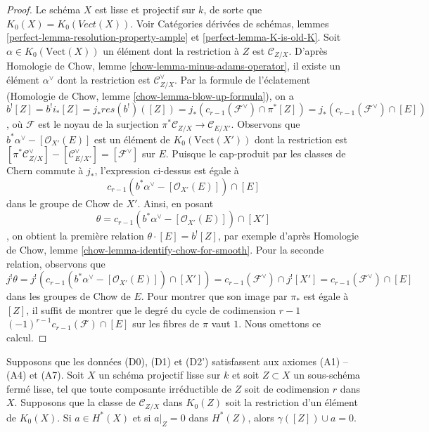\begin{proof}
Le schéma $X$ est lisse et projectif sur $k$, de sorte que
$K_0(X) = K_0(\textit{Vect}(X))$. Voir
Catégories dérivées de schémas, lemmes
\ref{perfect-lemma-resolution-property-ample} et
\ref{perfect-lemma-K-is-old-K}.
Soit $\alpha \in K_0(\text{Vect}(X))$ un élément
dont la restriction à $Z$ est $\mathcal{C}_{Z/X}$.
D'après Homologie de Chow, lemme \ref{chow-lemma-minus-adams-operator},
il existe un élément $\alpha^\vee$ dont la restriction est
$\mathcal{C}_{Z/X}^\vee$. Par la formule de l'éclatement
(Homologie de Chow, lemme \ref{chow-lemma-blow-up-formula}),
on a
$$
b^![Z] = b^!i_*[Z] = j_* res(b^!)([Z]) =
j_*(c_{r - 1}(\mathcal{F}^\vee) \cap \pi^*[Z]) =
j_*(c_{r - 1}(\mathcal{F}^\vee) \cap [E])
$$,
où $\mathcal{F}$ est le noyau de la surjection
$\pi^*\mathcal{C}_{Z/X} \to \mathcal{C}_{E/X'}$.
Observons que $b^*\alpha^\vee - [\mathcal{O}_{X'}(E)]$
est un élément de $K_0(\text{Vect}(X'))$
dont la restriction est $[\pi^*\mathcal{C}_{Z/X}^\vee] - [\mathcal{C}_{E/X'}^\vee] =
[\mathcal{F}^\vee]$ sur $E$. Puisque le cap-produit par les classes de Chern
commute à $j_*$, l'expression ci-dessus est égale à
$$
c_{r - 1}(b^*\alpha^\vee - [\mathcal{O}_{X'}(E)]) \cap [E]
$$
dans le groupe de Chow de $X'$. Ainsi, en posant
$$
\theta = c_{r - 1}(b^*\alpha^\vee - [\mathcal{O}_{X'}(E)]) \cap [X']
$$,
on obtient la première relation $\theta \cdot [E] = b^![Z]$,
par exemple d'après Homologie de Chow, lemme \ref{chow-lemma-identify-chow-for-smooth}.
Pour la seconde relation, observons que
$$
j^!\theta = j^!(c_{r - 1}(b^*\alpha^\vee - [\mathcal{O}_{X'}(E)]) \cap [X'])
= c_{r - 1}(\mathcal{F}^\vee) \cap j^![X'] =
c_{r - 1}(\mathcal{F}^\vee) \cap [E]
$$
dans les groupes de Chow de $E$. Pour montrer que son image par $\pi_*$ est égale à $[Z]$,
il suffit de montrer que le degré du cycle de codimension $r - 1$
$(-1)^{r - 1}c_{r - 1}(\mathcal{F}) \cap [E]$ sur les fibres de $\pi$ vaut $1$.
Nous omettons ce calcul.
\end{proof}

\begin{lemma}
\label{lemma-A5-A6-imply}
Supposons que les données (D0), (D1) et (D2') satisfassent aux axiomes (A1) -- (A4)
et (A7). Soit $X$ un schéma projectif lisse sur $k$ et soit $Z \subset X$
un sous-schéma fermé lisse, tel que toute composante irréductible de $Z$
soit de codimension $r$ dans $X$. Supposons que la classe de
$\mathcal{C}_{Z/X}$ dans $K_0(Z)$ soit la restriction d'un élément de $K_0(X)$.
Si $a \in H^*(X)$ et si $a|_Z = 0$ dans $H^*(Z)$, alors
$\gamma([Z]) \cup a = 0$.
\end{lemma}

